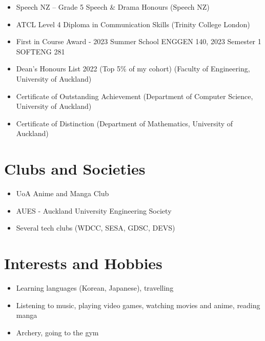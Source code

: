 \documentclass[a4paper,12pt]{article}
\newcommand{\sectionicon}[2]{%
    \section[#1]{\faIcon{#2}\quad #1}%
}
\begin{document}
\begin{itemize}
    \item Speech NZ – Grade 5 Speech \& Drama Honours (Speech NZ)
    \item ATCL Level 4 Diploma in Communication Skills (Trinity College London)
    \item First in Course Award - 2023 Summer School ENGGEN 140, 2023 Semester 1 SOFTENG 281
    \item Dean’s Honours List 2022 (Top 5\% of my cohort) (Faculty of Engineering, University of Auckland)
    \item Certificate of Outstanding Achievement (Department of Computer Science, University of Auckland)
    \item Certificate of Distinction (Department of Mathematics, University of Auckland)
\end{itemize}

\sectionicon{Clubs and Societies}{users}

\begin{itemize}
    \item UoA Anime and Manga Club
    \item AUES - Auckland University Engineering Society
    \item Several tech clubs (WDCC, SESA, GDSC, DEVS)
\end{itemize}


\sectionicon{Interests and Hobbies}{heart}

\begin{itemize}
    \item Learning languages (Korean, Japanese), travelling
    \item Listening to music, playing video games, watching movies and anime, reading manga
    \item Archery, going to the gym
\end{itemize}


\end{document}

